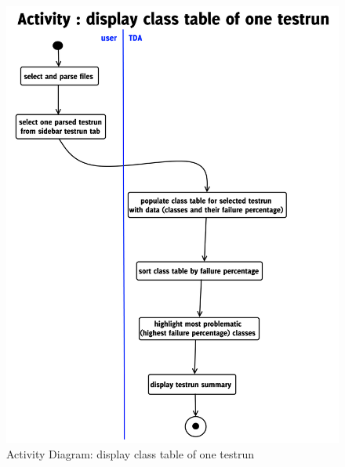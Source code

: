 \ \\
\begin{figure}[h]
\begin{center}
\includegraphics[scale=0.3]{pics/activityDisplayClassTableOfOneTestrun.png}
\caption{Activity Diagram: display class table of one testrun} 
\label{AD-CToOTR}
\end{center}
\end{figure}
\ \\
